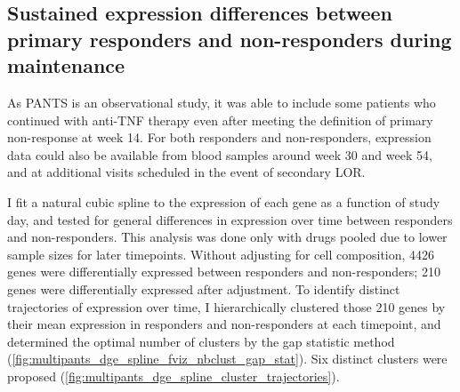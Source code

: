 \subsection{Sustained expression differences between primary responders and non-responders during maintenance}

As \gls{PANTS} is an observational study, it was able to include some patients who continued with anti-\gls{TNF} therapy
even after meeting the definition of primary non-response at week 14.
For both responders and non-responders, expression data could also be available from blood samples around week 30 and week 54, and at additional visits scheduled in the event of secondary LOR.

I fit a natural cubic spline to the expression of each gene as a function of study day, and tested for general differences in expression over time between responders and non-responders.
This analysis was done only with drugs pooled due to lower sample sizes for later timepoints.
Without adjusting for cell composition, 
4426 genes were differentially expressed between responders and non-responders;
210 genes were differentially expressed after adjustment.
To identify distinct trajectories of expression over time, I hierarchically clustered those 210 genes by
their mean expression in responders and non-responders at each timepoint, 
and determined the optimal number of clusters by the gap statistic method (\autoref{fig:multipants_dge_spline_fviz_nbclust_gap_stat}).
Six distinct clusters were proposed (\autoref{fig:multipants_dge_spline_cluster_trajectories}).

